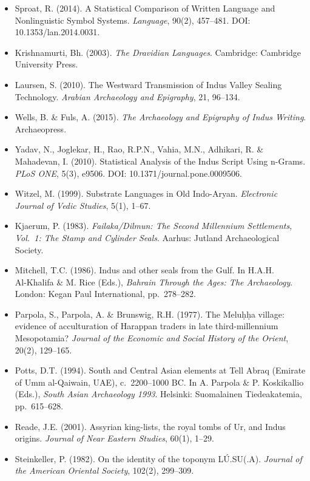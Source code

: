 \documentclass[
]{article}
\begin{document}
\begin{itemize}
\item
  Sproat, R. (2014). A Statistical Comparison of Written Language and Nonlinguistic Symbol Systems. \emph{Language}, 90(2), 457--481. DOI: 10.1353/lan.2014.0031.
\item
  Krishnamurti, Bh. (2003). \emph{The Dravidian Languages}. Cambridge:
  Cambridge University Press.
\item
  Laursen, S. (2010). The Westward Transmission of Indus Valley Sealing
  Technology. \emph{Arabian Archaeology and Epigraphy}, 21, 96--134.
\item
  Wells, B. \& Fuls, A. (2015). \emph{The Archaeology and Epigraphy of
  Indus Writing}. Archaeopress.
\item
  Yadav, N., Joglekar, H., Rao, R.P.N., Vahia, M.N., Adhikari, R. \&
  Mahadevan, I. (2010). Statistical Analysis of the Indus Script Using
  n-Grams. \emph{PLoS ONE}, 5(3), e9506. DOI:
  10.1371/journal.pone.0009506.
\item
  Witzel, M. (1999). Substrate Languages in Old Indo-Aryan.
  \emph{Electronic Journal of Vedic Studies}, 5(1), 1--67.
\item
  Kjaerum, P. (1983). \emph{Failaka/Dilmun: The Second Millennium
  Settlements, Vol.~1: The Stamp and Cylinder Seals}. Aarhus:
  Jutland Archaeological Society.
\item
  Mitchell, T.C. (1986). Indus and other seals from the Gulf. In
  H.A.H.\\ Al-Khalifa \& M. Rice (Eds.), \emph{Bahrain Through the
  Ages: The Archaeology}. London: Kegan Paul International, pp.~278--282.
\item
  Parpola, S., Parpola, A. \& Brunswig, R.H. (1977). The Melu\d{h}\d{h}a
  village: evidence of acculturation of Harappan traders in late
  third-millennium Mesopotamia? \emph{Journal of the Economic and
  Social History of the Orient}, 20(2), 129--165.
\item
  Potts, D.T. (1994). South and Central Asian elements at Tell Abraq
  (Emirate of Umm al-Qaiwain, UAE), c.~2200--1000 BC. In
  A. Parpola \& P. Koskikallio (Eds.), \emph{South Asian Archaeology
  1993}. Helsinki: Suomalainen Tiedeakatemia, pp.~615--628.
\item
  Reade, J.E. (2001). Assyrian king-lists, the royal tombs of Ur, and
  Indus origins. \emph{Journal of Near Eastern Studies}, 60(1), 1--29.
\item
  Steinkeller, P. (1982). On the identity of the toponym
  L\'{U}.SU(.A). \emph{Journal of the American Oriental Society},
  102(2), 299--309.
\end{itemize}
\end{document}
